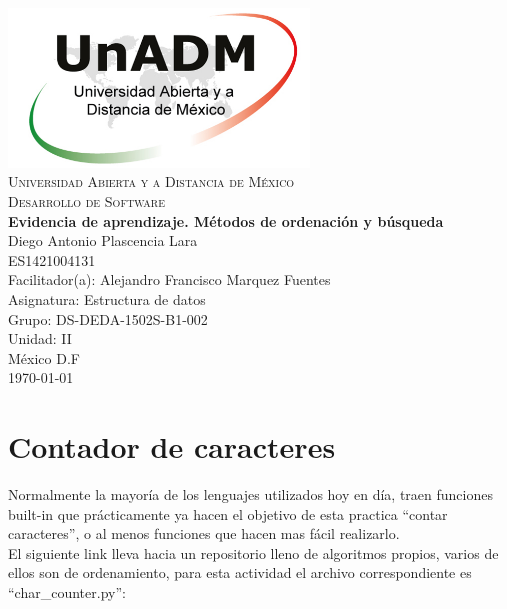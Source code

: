 \documentclass[spanish,12pt,letterpapper]{article}
\begin{document}
	\begin{titlepage}
		\begin{center}
			\includegraphics[width=0.6\textwidth]{../logoUnADM}~\\[1cm] 
			\textsc{Universidad Abierta y a Distancia de M\'exico}\\[0.8cm]
			\textsc{Desarrollo de Software}\\[1.8cm]
			
			\textbf{ \Large Evidencia de aprendizaje. Métodos de ordenación y búsqueda}\\[3cm]
			
			Diego Antonio Plascencia Lara\\ ES1421004131 \\[0.4cm]
			Facilitador(a): Alejandro Francisco Marquez Fuentes\\
			Asignatura: Estructura de datos\\
			Grupo: DS-DEDA-1502S-B1-002 \\
			Unidad: II \\
			
			\vfill M\'exico D.F\\{\today}
			
		\end{center}
	\end{titlepage}
	
	\section{Contador de caracteres \\}
	
	Normalmente la mayoría de los lenguajes utilizados hoy en día, traen funciones built-in que prácticamente ya hacen el objetivo de esta practica ``contar caracteres'', o al menos funciones que hacen mas fácil realizarlo.\\
	
	El siguiente link lleva hacia un repositorio lleno de algoritmos propios, varios de ellos son de ordenamiento, para esta actividad el archivo correspondiente es ``char\_counter.py'':\\
	
\end{document}
